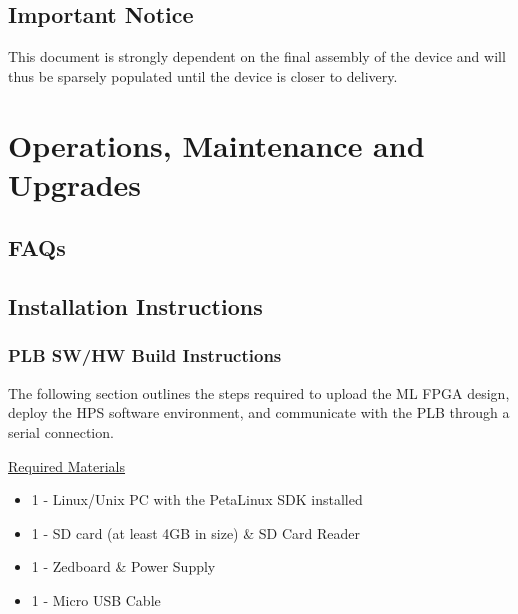 \documentclass[10pt,letterpaper]{article}
\begin{document}
\subsection{Important Notice}
This document is strongly dependent on the final assembly of the device and will thus be sparsely populated until the device is closer to delivery.

\section{Operations, Maintenance and Upgrades}
\subsection{FAQs}
\clearpage
\subsection{Installation Instructions}
\subsubsection{PLB SW/HW Build Instructions}
The following section outlines the steps required to upload the ML FPGA design, deploy the HPS software environment, and communicate with the PLB through a serial connection.

\underline{Required Materials}
\begin{itemize}
\item 1 - Linux/Unix PC with the PetaLinux SDK\cite{petalinux} installed
\item 1 - SD card (at least 4GB in size) \& SD Card Reader
\item 1 - Zedboard \& Power Supply
\item 1 - Micro USB Cable
\end{itemize}
\end{document}
